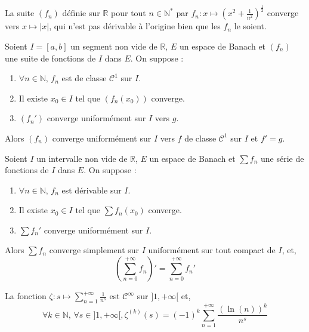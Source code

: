   \begin{cexample}
    La suite $(f_n)$ définie sur $\mathbb{R}$ pour tout $n \in \mathbb{N}^*$ par $f_n : x \mapsto \left( x^2 + \frac{1}{n^2} \right)^{\frac{1}{2}}$ converge vers $x \mapsto \vert x \vert$, qui n'est pas dérivable à l'origine bien que les $f_n$ le soient.
  \end{cexample}


  \begin{theorem}
    Soient $I = [a,b]$ un segment non vide de $\mathbb{R}$, $E$ un espace de Banach et $(f_n)$ une suite de fonctions de $I$ dans $E$. On suppose :
    \begin{enumerate}[label={\bfseries(\roman*)}]
      \item $\forall n \in \mathbb{N}, \, f_n$ est de classe $\mathcal{C}^1$ sur $I$.
      \item Il existe $x_0 \in I$ tel que $(f_n(x_0))$ converge.
      \item $(f_n')$ converge uniformément sur $I$ vers $g$.
    \end{enumerate}
    Alors $(f_n)$ converge uniformément sur $I$ vers $f$ de classe $\mathcal{C}^1$ sur $I$ et $f' = g$.
  \end{theorem}

  \begin{theorem}
    Soient $I$ un intervalle non vide de $\mathbb{R}$, $E$ un espace de Banach et $\sum f_n$ une série de fonctions de $I$ dans $E$. On suppose :
    \begin{enumerate}[label={\bfseries(\roman*)}]
      \item $\forall n \in \mathbb{N}, \, f_n$ est dérivable sur $I$.
      \item Il existe $x_0 \in I$ tel que $\sum f_n(x_0)$ converge.
      \item $\sum f_n'$ converge uniformément sur $I$.
    \end{enumerate}
    Alors $\sum f_n$ converge simplement sur $I$ uniformément sur tout compact de $I$, et,
    \[ \left( \sum_{n=0}^{+\infty} f_n \right)' = \sum_{n=0}^{+\infty} f_n' \]
  \end{theorem}

  \begin{example}
    La fonction $\zeta : s \mapsto \sum_{n=1}^{+\infty} \frac{1}{n^s}$ est $\mathcal{C}^\infty$ sur $]1, +\infty[$ et,
    \[ \forall k \in \mathbb{N}, \, \forall s \in ]1, +\infty[, \zeta^{(k)}(s) = (-1)^k \sum_{n=1}^{+\infty} \frac{(\ln(n))^k}{n^s} \]
  \end{example}

